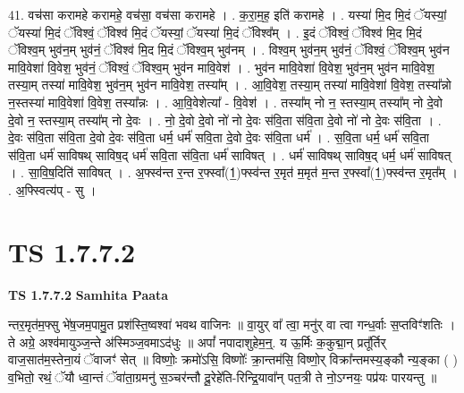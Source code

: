 \documentclass[17pt]{extarticle}
\begin{document}
41. वच॑सा करामहे करामहे॒ वच॑सा॒ वच॑सा करामहे । . क॒रा॒म॒ह॒ इति॑ करामहे । . यस्या॑ मि॒द मि॒दं ॅयस्यां॒ ॅयस्या॑ मि॒दं ॅविश्वं॒ ॅविश्व॑ मि॒दं ॅयस्यां॒ ॅयस्या॑ मि॒दं ॅविश्व᳚म् । . इ॒दं ॅविश्वं॒ ॅविश्व॑ मि॒द मि॒दं ॅविश्व॒म् भुव॑न॒म् भुव॑नं॒ ॅविश्व॑ मि॒द मि॒दं ॅविश्व॒म् भुव॑नम् । . विश्व॒म् भुव॑न॒म् भुव॑नं॒ ॅविश्वं॒ ॅविश्व॒म् भुव॑न मावि॒वेशा॑ वि॒वेश॒ भुव॑नं॒ ॅविश्वं॒ ॅविश्व॒म् भुव॑न मावि॒वेश॑ । . भुव॑न मावि॒वेशा॑ वि॒वेश॒ भुव॑न॒म् भुव॑न मावि॒वेश॒ तस्या॒म् तस्या॑ मावि॒वेश॒ भुव॑न॒म् भुव॑न मावि॒वेश॒ तस्या᳚म् । . आ॒वि॒वेश॒ तस्या॒म् तस्या॑ मावि॒वेशा॑ वि॒वेश॒ तस्या᳚न्नो न॒स्तस्या॑ मावि॒वेशा॑ वि॒वेश॒ तस्या᳚न्नः । . आ॒वि॒वेशेत्या᳚ - वि॒वेश॑ । . तस्या᳚म् नो न॒ स्तस्या॒म् तस्या᳚म् नो दे॒वो दे॒वो न॒ स्तस्या॒म् तस्या᳚म् नो दे॒वः । . नो॒ दे॒वो दे॒वो नो॑ नो दे॒वः स॑वि॒ता स॑वि॒ता दे॒वो नो॑ नो दे॒वः स॑वि॒ता । . दे॒वः स॑वि॒ता स॑वि॒ता दे॒वो दे॒वः स॑वि॒ता धर्म॒ धर्म॑ सवि॒ता दे॒वो दे॒वः स॑वि॒ता धर्म॑ । . स॒वि॒ता धर्म॒ धर्म॑ सवि॒ता स॑वि॒ता धर्म॑ साविषथ् साविष॒द् धर्म॑ सवि॒ता स॑वि॒ता धर्म॑ साविषत् । . धर्म॑ साविषथ् साविष॒द् धर्म॒ धर्म॑ साविषत् । . सा॒वि॒ष॒दिति॑ साविषत् । . अ॒फ्स्व॑न्त र॒न्त र॒फ्स्वा᳚(1॒)फ्स्व॑न्त र॒मृत॑ म॒मृत॑ म॒न्त र॒फ्स्वा᳚(1॒)फ्स्व॑न्त र॒मृत᳚म् । . अ॒फ्स्वित्य॑प् - सु । \newline
\pagebreak
{}
\section*{ TS 1.7.7.2 }

\textbf{TS 1.7.7.2 } \newline
\textbf{Samhita Paata} \newline

न्तर॒मृत॑म॒फ्सु भे॑ष॒जम॒पामु॒त प्रश॑स्ति॒ष्वश्वा॑ भवथ वाजिनः ॥ वा॒युर् वा᳚ त्वा॒ मनु॑र् वा त्वा गन्ध॒र्वाः स॒प्तविꣳ॑शतिः । ते अग्रे॒ अश्व॑मायुञ्ज॒न्ते अ॑स्मिञ्ज॒वमाऽद॑धुः ॥ अपां᳚ नपादाशुहेम॒न्॒. य ऊ॒र्मिः क॒कुद्मा॒न् प्रतू᳚र्तिर् वाज॒सात॑म॒स्तेना॒यं ॅवाजꣳ॑ सेत् ॥ विष्णोः॒ क्रमो॑ऽसि॒ विष्णोः᳚ क्रा॒न्तम॑सि॒ विष्णो॒र् विक्रा᳚न्तमस्य॒ङ्कौ न्य॒ङ्का ( ) व॒भितो॒ रथं॒ ॅयौ ध्वा॒न्तं ॅवा॑ता॒ग्रमनु॑ स॒ञ्चर॑न्तौ दू॒रेहे॑ति-रिन्द्रि॒यावा᳚न् पत॒त्री ते नो॒ऽग्नयः॒ पप्र॑यः पारयन्तु ॥ \newline
\end{document}

